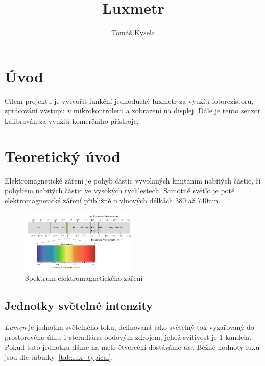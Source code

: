 \documentclass[a4paper,10pt,titlepage]{article}
\author{Tomáš Kysela}
\title{Luxmetr}
\date{\parbox{\linewidth}{\centering%
  \today\endgraf\bigskip
 Vytvořeno jako semestrální projekt pro předmět BAB34BSP\endgraf\medskip
 FEL ČVUT}}
\begin{document}
\begin{titlepage}

	\maketitle

	\thispagestyle{empty}
\end{titlepage}


\tableofcontents
\listoffigures
\listoftables

\newpage

\section{Úvod} \label{sec:intro}
Cílem projektu je vytvořit funkční jednoduchý luxmetr za využítí fotorezistoru, zprácování výstupu v mikrokontroleru a zobrazení na displej. Dále je tento senzor kalibrován za využití komerčního přístroje.

\section{Teoretický úvod} \label{sec:theory}
Elektromagnetické záření je pohyb částic vyvolaných kmitáním nabitých částic, či pohybem nabitých částic ve vysokých rychlestech. Samotné světlo je poté elektromagnetické záření přibližně o vlnových délkách 380 až 740nm.~\cite{radiation}

\begin{figure}[h]
	\centering
	\includegraphics[width=0.5\textwidth]{assets/spectrum.png}
	\caption[Spektrum elektromagnetického záření]{Spektrum elektromagnetického záření~\cite{radiation}}
\end{figure}

\subsection{Jednotky světelné intenzity}
\textit{Lumen} je jednotka světelného toku, definovaná jako světelný tok vyzařovaný do prostorového úhlu 1 steradiánu bodovým zdrojem, jehož svítivost je 1 kandela. Pokud tuto jednotku dáme na metr čtvereční dostáváme \textit{lux}. Běžné hodnoty luxů jsou dle tabulky~\ref{tab:lux_typical}.
\end{document}
